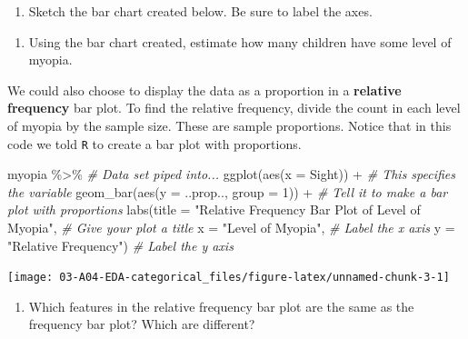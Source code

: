 \documentclass[
]{report}
\newenvironment{Shaded}{\begin{snugshade}}{\end{snugshade}}
\newcommand{\AttributeTok}[1]{\textcolor[rgb]{0.77,0.63,0.00}{#1}}
\newcommand{\CommentTok}[1]{\textcolor[rgb]{0.56,0.35,0.01}{\textit{#1}}}
\newcommand{\DecValTok}[1]{\textcolor[rgb]{0.00,0.00,0.81}{#1}}
\newcommand{\FunctionTok}[1]{\textcolor[rgb]{0.00,0.00,0.00}{#1}}
\newcommand{\NormalTok}[1]{#1}
\newcommand{\SpecialCharTok}[1]{\textcolor[rgb]{0.00,0.00,0.00}{#1}}
\newcommand{\StringTok}[1]{\textcolor[rgb]{0.31,0.60,0.02}{#1}}
\providecommand{\tightlist}{%
  \setlength{\itemsep}{0pt}\setlength{\parskip}{0pt}}
\begin{document}
\begin{enumerate}
\def\labelenumi{\arabic{enumi}.}
\setcounter{enumi}{1}
\tightlist
\item
  Sketch the bar chart created below. Be sure to label the axes.
\end{enumerate}

\vspace{2in}

\begin{enumerate}
\def\labelenumi{\arabic{enumi}.}
\setcounter{enumi}{2}
\tightlist
\item
  Using the bar chart created, estimate how many children have some level of myopia.
\end{enumerate}

\newpage

We could also choose to display the data as a proportion in a \textbf{relative frequency} bar plot. To find the relative frequency, divide the count in each level of myopia by the sample size. These are sample proportions. Notice that in this code we told \texttt{R} to create a bar plot with proportions.

\begin{Shaded}
\begin{Highlighting}[]
\NormalTok{myopia }\SpecialCharTok{\%\textgreater{}\%} \CommentTok{\# Data set piped into...}
\FunctionTok{ggplot}\NormalTok{(}\FunctionTok{aes}\NormalTok{(}\AttributeTok{x =}\NormalTok{ Sight)) }\SpecialCharTok{+}   \CommentTok{\# This specifies the variable}
  \FunctionTok{geom\_bar}\NormalTok{(}\FunctionTok{aes}\NormalTok{(}\AttributeTok{y =}\NormalTok{ ..prop.., }\AttributeTok{group =} \DecValTok{1}\NormalTok{)) }\SpecialCharTok{+}  \CommentTok{\# Tell it to make a bar plot with proportions}
  \FunctionTok{labs}\NormalTok{(}\AttributeTok{title =} \StringTok{"Relative Frequency Bar Plot of Level of Myopia"}\NormalTok{,  }\CommentTok{\# Give your plot a title}
       \AttributeTok{x =} \StringTok{"Level of Myopia"}\NormalTok{,   }\CommentTok{\# Label the x axis}
       \AttributeTok{y =} \StringTok{"Relative Frequency"}\NormalTok{)  }\CommentTok{\# Label the y axis}
\end{Highlighting}
\end{Shaded}

\begin{center}\texttt{[image: 03-A04-EDA-categorical\_files/figure-latex/unnamed-chunk-3-1]} \end{center}

\begin{enumerate}
\def\labelenumi{\arabic{enumi}.}
\setcounter{enumi}{3}
\tightlist
\item
  Which features in the relative frequency bar plot are the same as the frequency bar plot? Which are different?
\end{enumerate}
\end{document}
